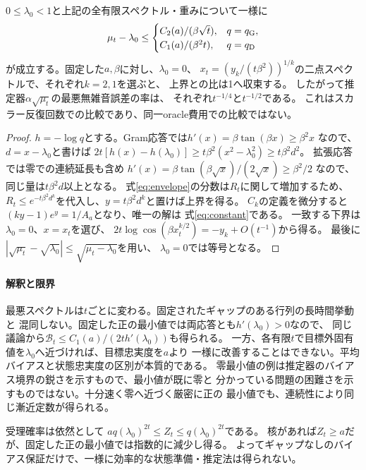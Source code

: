 \begin{theorem}[一様収束率と鋭い漸近定数]\label{thm:rates}
$0\leq\lambda_0<1$と上記の全有限スペクトル・重みについて一様に
\begin{equation}\label{eq:rates}
 \mu_t-\lambda_0\leq
 \begin{cases}
 C_2(a)/(\beta\sqrt{t}), &q=q_{\rm G},\\
 C_1(a)/(\beta^2t), &q=q_{\rm D}
 \end{cases}
\end{equation}
が成立する。固定した$a,\beta$に対し、$\lambda_0=0$、
$x_t=(y_k/(t\beta^2))^{1/k}$の二点スペクトルで、それぞれ$k=2,1$を選ぶと、
上界との比は1へ収束する。
したがって推定器$\alpha\sqrt{\mu_t}$の最悪無雑音誤差の率は、
それぞれ$t^{-1/4}$と$t^{-1/2}$である。
これはスカラー反復回数での比較であり、同一oracle費用での比較ではない。
\end{theorem}
\begin{proof}
$h=-\log q$とする。Gram応答では$h'(x)=\beta\tan(\beta x)\geq\beta^2x$
なので、$d=x-\lambda_0$と書けば
$2t[h(x)-h(\lambda_0)]\geq t\beta^2(x^2-\lambda_0^2)\geq t\beta^2d^2$。
拡張応答では零での連続延長も含め
$h'(x)=\beta\tan(\beta\sqrt{x})/(2\sqrt{x})\geq\beta^2/2$
なので、同じ量は$t\beta^2d$以上となる。
式\eqref{eq:envelope}の分数は$R_t$に関して増加するため、
$R_t\leq e^{-t\beta^2d^k}$を代入し、$y=t\beta^2d^k$と置けば上界を得る。
$C_k$の定義を微分すると$(ky-1)e^y=1/A_a$となり、唯一の解は
式\eqref{eq:constant}である。
一致する下界は$\lambda_0=0$、$x=x_t$を選び、
$2t\log\cos(\beta x_t^{k/2})=-y_k+O(t^{-1})$から得る。
最後に$|\sqrt{\mu_t}-\sqrt{\lambda_0}|\leq\sqrt{\mu_t-\lambda_0}$を用い、
$\lambda_0=0$では等号となる。
\end{proof}

\paragraph{解釈と限界}
最悪スペクトルは$t$ごとに変わる。固定されたギャップのある行列の長時間挙動と
混同しない。固定した正の最小値では両応答とも$h'(\lambda_0)>0$なので、
同じ議論から$\mathcal B_t\leq C_1(a)/(2t h'(\lambda_0))$も得られる。
一方、各有限$t$で目標外固有値を$\lambda_0$へ近づければ、目標忠実度を$a$より
一様に改善することはできない。平均バイアスと状態忠実度の区別が本質的である。
零最小値の例は推定器のバイアス境界の鋭さを示すもので、最小値が既に零と
分かっている問題の困難さを示すものではない。十分速く零へ近づく厳密に正の
最小値でも、連続性により同じ漸近定数が得られる。

受理確率は依然として
$a q(\lambda_0)^{2t}\leq Z_t\leq q(\lambda_0)^{2t}$である。
核があれば$Z_t\geq a$だが、固定した正の最小値では指数的に減少し得る。
よってギャップなしのバイアス保証だけで、一様に効率的な状態準備・推定法は得られない。

